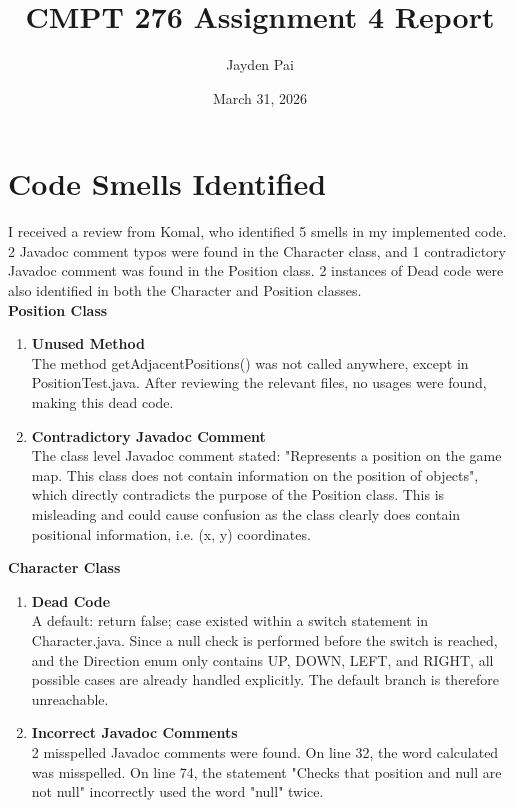 \documentclass[12pt]{article}
\title{CMPT 276 Assignment 4 Report}
\author{Jayden Pai}
\date{March 31, 2026}
\begin{document}
\maketitle

\section{Code Smells Identified}
I received a review from Komal, who identified 5 smells in my implemented code. 2 Javadoc comment typos were found in the Character class, and 1 contradictory Javadoc 
comment was found in the Position class. 2 instances of Dead code were also identified in both the Character and Position classes. \\

\noindent\textbf{Position Class}
\begin{enumerate}
	\item \textbf{Unused Method} \\
	The method getAdjacentPositions() was not called anywhere, except in PositionTest.java. After reviewing the relevant files, no usages were found, making this dead code.
	
	\item \textbf{Contradictory Javadoc Comment} \\
	The class level Javadoc comment stated: "Represents a position on the game map.
	This class does not contain information on the position of objects", which directly contradicts the purpose of the Position class. This is misleading and could cause
	confusion as the class clearly does contain positional information, i.e. (x, y) coordinates. 
\end{enumerate}

\noindent\textbf{Character Class}
\begin{enumerate}
	\item \textbf{Dead Code} \\
	A default: return false; case existed within a switch statement in Character.java. Since a null check is performed before the switch is reached, and the Direction enum only contains UP, DOWN, LEFT, and RIGHT, all possible cases are already handled explicitly. The default branch is therefore unreachable.
	
	\item \textbf{Incorrect Javadoc Comments} \\
	2 misspelled Javadoc comments were found. On line 32, the word calculated was misspelled. On line 74, the statement "Checks that position and null are not null" incorrectly used the word "null" twice.
\end{enumerate}
\end{document}
